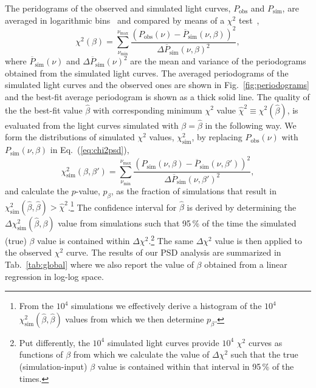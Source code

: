 \documentclass[twocolumn,linenumbers]{aastex62}
\begin{document}
The peridograms of the observed and simulated light curves, ${P}_\mathrm{obs}$ and ${P}_\mathrm{sim}$, are averaged in logarithmic bins~\citep{1993MNRAS.261..612P} and compared by means of a $\chi^2$ test~\citep{2014MNRAS.445..437M},
\begin{equation}
    \chi^2(\beta) = \sum_{\nu_\mathrm{min}}^{\nu_\mathrm{max}}\frac{(P_\mathrm{obs}(\nu) - \overline{P}_\mathrm{sim}(\nu,\beta))^2}{\Delta\overline{P}_\mathrm{sim}(\nu,\beta)^2},\label{eq:chi2psd}
\end{equation}
where $\overline{P}_\mathrm{sim}(\nu)$ and $\Delta\overline{P}_\mathrm{sim}(\nu)^2$ are the mean and variance of the periodograms obtained from the simulated light curves.
The averaged periodograms of the simulated light curves and the observed ones are shown in Fig.~\ref{fig:periodograms} and the best-fit average periodogram is shown as a thick solid line. 
The quality of the the best-fit value $\hat\beta$ with corresponding minimum $\chi^2$ value $\hat\chi^2\equiv\chi^2(\hat\beta)$, is evaluated from the light curves simulated with $\beta = \hat\beta$ in the following way. We form the distributions of simulated $\chi^2$ values, $\chi^2_\mathrm{sim}$, by replacing $P_\mathrm{obs}(\nu)$ with $P_\mathrm{sim}(\nu,\beta)$ in Eq.~(\ref{eq:chi2psd}),
\begin{equation}
    \chi^2_\mathrm{sim}(\beta,\beta') = \sum_{\nu_\mathrm{min}}^{\nu_\mathrm{max}}\frac{(P_\mathrm{sim}(\nu,\beta) - \overline{P}_\mathrm{sim}(\nu,\beta'))^2}{\Delta\overline{P}_\mathrm{sim}(\nu,\beta')^2},\label{eq:chi2psd_sim}
\end{equation}
and calculate the $p$-value, $p_\beta$, as the  fraction of simulations that result in $\chi^2_\mathrm{sim}(\hat\beta,\hat\beta) > \hat\chi^2$.\footnote{From the $10^4$ simulations we effectively derive a histogram of the $10^4$ $\chi^2_\mathrm{sim}(\hat\beta,\hat\beta)$ values from which we then determine $p_\beta$.}
The confidence interval for $\hat\beta$ is derived by determining the $\Delta\chi^2_\mathrm{sim}(\hat{\beta},\beta)$ value from simulations such that 95\,\% of the time the simulated (true) $\beta$ value is contained within $\Delta\chi^2$.\footnote{Put differently, the $10^4$ simulated light curves provide $10^4$ $\chi^2$ curves as functions of $\beta$ from which we calculate the value of $\Delta\chi^2$ such that the true (simulation-input) $\beta$ value is contained within that interval in 95\,\% of the times.}
The same $\Delta\chi^2$ value is then applied to the observed $\chi^2$ curve.
The results of our PSD analysis are summarized in Tab.~\ref{tab:global} where we also report the value of $\beta$ obtained from a linear regression in log-log space. 
\end{document}
